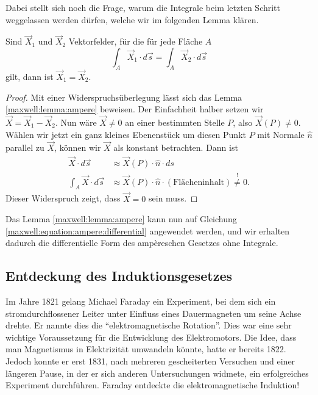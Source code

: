 Dabei stellt sich noch die Frage, warum die Integrale beim letzten Schritt weggelassen werden dürfen, welche wir im folgenden Lemma klären.
\begin{lemma}
	\label{maxwell:lemma:ampere}
	Sind $\vec{X}_1$ und $\vec{X}_2$ Vektorfelder, für die für jede Fläche $A$
	\[
	\int_A \vec{X}_1\cdot d\vec{s}
	=
	\int_A \vec{X}_2\cdot d\vec{s}
	\]
	gilt, dann ist $\vec{X}_1=\vec{X}_2$.
\end{lemma}

\begin{proof}
	\label{maxwell:proof:ampere}
	Mit einer Widerspruchsüberlegung lässt sich das Lemma \ref{maxwell:lemma:ampere} beweisen.
	Der Einfachheit halber setzen wir $\vec{X} = \vec{X}_1-\vec{X}_2$.
	Nun wäre $\vec{X} \ne 0$ an einer bestimmten Stelle $P$, also $\vec{X}(P) \ne 0$.
	Wählen wir jetzt ein ganz kleines Ebenenstück um diesen Punkt $P$ mit Normale $\hat{n}$ parallel zu $\vec{X}$, können wir $\vec{X}$ als konstant betrachten. 
	Dann ist
	\begin{align*}
		\vec{X} \cdot d\vec{s} 
		&\approx
		\vec{X}(P) \cdot \hat{n} \cdot ds
		\\
		\int_{A} \vec{X} \cdot d\vec{s}
		&\approx
		\vec{X}(P) \cdot \hat{n} \cdot (\text{Flächeninhalt}) \overset{!}{\ne} 0.
	\end{align*}
	Dieser Widerspruch zeigt, dass $\vec{X} = 0$ sein muss.
\end{proof}
Das Lemma \ref{maxwell:lemma:ampere} kann nun auf Gleichung \eqref{maxwell:equation:ampere:differential} angewendet werden, und wir erhalten dadurch die differentielle Form des ampèreschen Gesetzes ohne Integrale.


\subsection{Entdeckung des Induktionsgesetzes}

Im Jahre 1821 gelang Michael Faraday ein Experiment, bei dem sich ein stromdurchflossener Leiter unter Einfluss eines Dauermagneten um seine Achse drehte.
Er nannte dies die ``elektromagnetische Rotation''.
Dies war eine sehr wichtige Voraussetzung für die Entwicklung des Elektromotors. 
Die Idee, dass man Magnetismus in Elektrizität umwandeln könnte, hatte er bereits 1822.
Jedoch konnte er erst 1831, nach mehreren gescheiterten Versuchen und einer längeren Pause, in der er sich anderen Untersuchungen widmete, ein erfolgreiches Experiment durchführen.
Faraday entdeckte die elektromagnetische Induktion!

